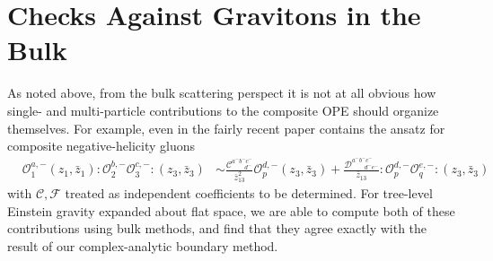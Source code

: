 \documentclass[11pt,letterpaper]{article}
\newcommand{\mc}[1]{\mathcal{#1}}
\begin{document}
\section{Checks Against Gravitons in the Bulk}
As noted above, from the bulk scattering perspect it is not at all obvious how single- and multi-particle contributions to the composite OPE should organize themselves. For example, even in the fairly recent paper \cite{Guevara:2024ixn} contains the ansatz for  composite negative-helicity gluons \begin{equation}
\begin{aligned}
& \mc{O}_1^{a,-}(z_1, \bar{z}_1) :\mc{O}_2^{b,-} \mc{O}_3^{c,-}:(z_3, \bar{z}_3)
& \sim \frac{\mc{C}^{a^- b^- c^-}_{ \ \ \ \ \ \ \ \ \ d^-}}{\bar{z}_{13}^2} \mc{O}^{d,-}_p(z_3, \bar{z}_3) + \frac{\mc{D}^{a^- b^- c^-}_{ \ \ \ \ \ \ \ \ \ d^- e^-}}{\bar{z}_{13}} : \mc{O}_p^{d, -} \mc{O}_q^{e,-}:(z_3, \bar{z}_3)
\end{aligned}
\end{equation}
with $\mc{C}, \mc{F}$ treated as independent coefficients to be determined. For tree-level Einstein gravity expanded about flat space, we are able to compute both of these contributions using bulk methods, and find that they agree exactly with the result of our complex-analytic boundary method.
\end{document}
